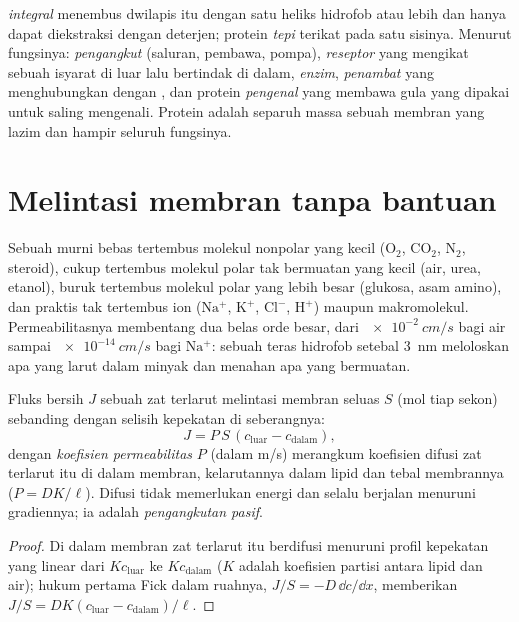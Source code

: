 \begin{definition}\label{def:b1:membranes-transport:proteins}
 \emph{integral} menembus
dwilapis itu dengan satu heliks hidrofob atau lebih dan hanya dapat
diekstraksi dengan deterjen; protein \emph{tepi} terikat pada satu
sisinya. Menurut fungsinya: \emph{pengangkut} (saluran, pembawa,
pompa), \emph{reseptor} yang mengikat sebuah isyarat di luar lalu
bertindak di dalam, \emph{enzim}, \emph{penambat} yang menghubungkan
 dengan , dan protein \emph{pengenal} yang
membawa gula yang dipakai  untuk saling mengenali. Protein adalah
separuh massa sebuah membran yang lazim dan hampir seluruh fungsinya.
\end{definition}

\section{Melintasi membran tanpa bantuan}

\begin{proposition}\label{prop:b1:membranes-transport:permeability}
Sebuah  murni bebas tertembus molekul nonpolar yang kecil
($\mathrm{O_2}$, $\mathrm{CO_2}$, $\mathrm{N_2}$, steroid), cukup
tertembus molekul polar tak bermuatan yang kecil (air, urea, etanol),
buruk tertembus molekul polar yang lebih besar (glukosa, asam amino),
dan praktis tak tertembus ion ($\mathrm{Na^+}$, $\mathrm{K^+}$,
$\mathrm{Cl^-}$, $\mathrm{H^+}$) maupun makromolekul.
Permeabilitasnya membentang dua belas orde besar, dari
$\qty{e-2}{cm/s}$ bagi air sampai $\qty{e-14}{cm/s}$ bagi
$\mathrm{Na^+}$: sebuah teras hidrofob setebal \qty{3}{nm} meloloskan
apa yang larut dalam minyak dan menahan apa yang bermuatan.
\end{proposition}

\begin{theorem}\label{thm:b1:membranes-transport:fick}
Fluks bersih $J$ sebuah zat terlarut melintasi membran seluas $S$ (mol
tiap sekon) sebanding dengan selisih kepekatan di seberangnya:
\[
J = P\,S\,(c_{\text{luar}} - c_{\text{dalam}}),
\]
dengan \emph{koefisien permeabilitas} $P$ (dalam \unit{m/s}) merangkum
koefisien difusi zat terlarut itu di dalam membran, kelarutannya dalam
lipid dan tebal membrannya ($P = DK/\ell$). Difusi tidak memerlukan
energi dan selalu berjalan menuruni gradiennya; ia adalah
\emph{pengangkutan pasif}.
\end{theorem}
\begin{proof}
Di dalam membran zat terlarut itu berdifusi menuruni profil kepekatan
yang linear dari $Kc_{\text{luar}}$ ke $Kc_{\text{dalam}}$ ($K$ adalah
koefisien partisi antara lipid dan air); hukum pertama Fick dalam
ruahnya, $J/S = -D\,\dd c/\dd x$, memberikan $J/S = DK(c_{\text{luar}} -
c_{\text{dalam}})/\ell$.
\end{proof}

